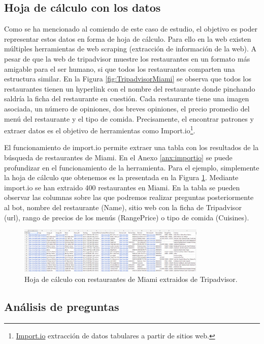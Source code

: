 \subsection{Hoja de cálculo con los datos}

Como se ha mencionado al comiendo de este caso de estudio, el objetivo es poder representar estos datos en forma de hoja de cálculo. Para ello en la web existen múltiples herramientas de web scraping (extracción de información de la web). A pesar de que la web de tripadvisor muestre los restaurantes en un formato más amigable para el ser humano, si que todos los restaurantes comparten una estructura similar. En la Figura \ref{fig:TripadvisorMiami} se observa que todos los restaurantes tienen un hyperlink con el nombre del restaurante donde pinchando saldría la ficha del restaurante en cuestión. Cada restaurante tiene una imagen asociada, un número de opiniones, dos breves opiniones, el precio promedio del menú del restaurante y el tipo de comida. Precisamente, el encontrar patrones y extraer datos es el objetivo de herramientas como Import.io\footnote{\href{https://www.import.io/}{Import.io} extracción de datos tabulares a partir de sitios web.}.

El funcionamiento de import.io permite extraer una tabla con los resultados de la búsqueda de restaurantes de Miami. En el Anexo \ref{anx:importio} se puede profundizar en el funcionamiento de la herramienta. Para el ejemplo, simplemente la hoja de cálculo que obtenemos es la presentada en la Figura \ref{fig:SheetTripadvisor}. Mediante import.io se han extraido 400 restaurantes en Miami. En la tabla se pueden observar las columnas sobre las que podremos realizar preguntas posteriormente al bot, nombre del restaurante (Name), sitio web con la ficha de Tripadvisor (url), rango de precios de los menús (RangePrice) o tipo de comida (Cuisines).

\begin{figure}[htb]
	\centering
	\includegraphics[width=0.8\textwidth]{./figs/sheetTripadvisor.png}
	\caption{Hoja de cálculo con restaurantes de Miami extraidos de Tripadvisor.}
	\label{fig:SheetTripadvisor}
\end{figure}

\subsection{Análisis de preguntas}

